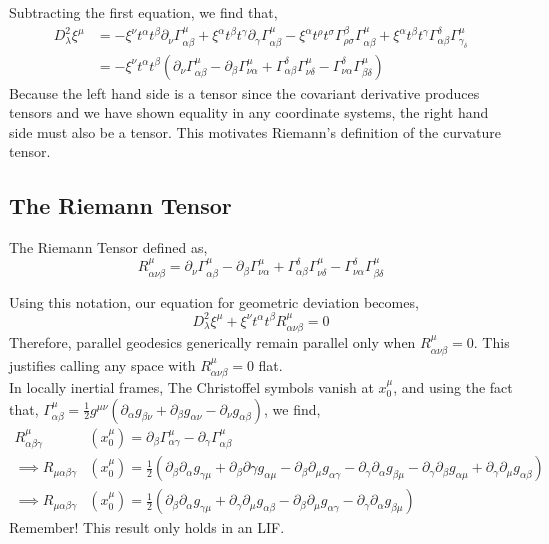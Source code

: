 \documentclass[11pt, a4paper]{article}
\begin{document}
Subtracting the first equation, we find that, 
\begin{align*}
D_\lambda^2 \xi^\mu & = -\xi^\nu t^\alpha t^\beta \partial_\nu \Gamma^\mu_{\alpha\beta} + \xi^\alpha t^\beta t^\gamma \partial_{\gamma}\Gamma^\mu_{\alpha\beta} - \xi^\alpha t^\rho t^\sigma \Gamma^\beta_{\rho\sigma}\Gamma^\mu_{\alpha\beta} + \xi^\alpha t^\beta t^\gamma\Gamma^\delta_{\alpha\beta}\Gamma^\mu_{\gamma_\delta}
\\
& = - \xi^\nu t^\alpha t^\beta \left( \partial_{\nu} \Gamma^\mu_{\alpha \beta} - \partial_{\beta} \Gamma^\mu_{\nu \alpha} + \Gamma^{\delta}_{\alpha \beta} \Gamma^{\mu}_{\nu \delta} - \Gamma^\delta_{\nu \alpha} \Gamma^\mu_{\beta \delta} \right)
\end{align*}
Because the left hand side is a tensor since the covariant derivative produces tensors and we have shown equality in any coordinate systems, the right hand side must also be a tensor. This motivates Riemann's definition of the curvature tensor. 
\subsection{The Riemann Tensor}

\begin{definition}
The Riemann Tensor defined as, 
\[R^\mu_{\alpha \nu \beta} = \partial_{\nu} \Gamma^\mu_{\alpha \beta} - \partial_{\beta} \Gamma^\mu_{\nu \alpha} + \Gamma^{\delta}_{\alpha \beta} \Gamma^{\mu}_{\nu \delta} - \Gamma^\delta_{\nu \alpha} \Gamma^\mu_{\beta \delta} \]
\end{definition}
\noindent
Using this notation, our equation for geometric deviation becomes,
\[ D_\lambda^2 \xi^\mu + \xi^\nu t^\alpha t^\beta R^\mu_{\alpha \nu \beta} = 0\]
Therefore, parallel geodesics generically remain parallel only when $R^\mu_{\alpha \nu \beta} = 0$. This justifies calling any space with $R^\mu_{\alpha \nu \beta} = 0$ flat.
\\
In locally inertial frames, The Christoffel symbols vanish at $x_0^\mu$, and using the fact that, $\Gamma^\mu_{\alpha\beta} = \frac{1}{2}g^{\mu\nu}\left(\partial_\alpha g_{\beta\nu}+\partial_\beta g_{\alpha\nu} - \partial_\nu g_{\alpha\beta}\right)$, 
we find, 
\begin{align*}R^\mu_{\alpha\beta\gamma}&\left(x^\mu_0\right) = \partial_\beta\Gamma^\mu_{\alpha\gamma} - \partial_\gamma\Gamma^\mu_{\alpha\beta}
\\
\implies R_{\mu\alpha\beta\gamma} &(x^\mu_0) = \frac{1}{2}\left(\partial_\beta \partial_\alpha g_{\gamma\mu} + \partial_\beta \partial \gamma g_{\alpha\mu} - \partial_\beta \partial_\mu g_{\alpha\gamma} - \partial_\gamma\partial_\alpha g_{\beta\mu} - \partial_\gamma\partial_\beta g_{\alpha\mu} + \partial_\gamma\partial_\mu g_{\alpha\beta}\right)
\\
\implies  R_{\mu\alpha\beta\gamma} &(x^\mu_0) =\frac{1}{2}\left(\partial_\beta\partial_\alpha g_{\gamma\mu} + \partial_\gamma\partial_\mu g_{\alpha\beta} - \partial_\beta\partial_\mu g_{\alpha\gamma} - \partial_\gamma\partial_\alpha g_{\beta\mu}\right)
\end{align*}
Remember!  This result only holds in an LIF.
\end{document}
